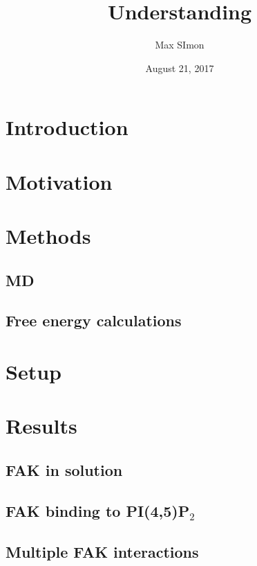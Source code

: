 \documentclass[
12pt, %
parskip=half, %
digital, %
oneside, %
]{bsc}
\title{Understanding}
\author{Max SImon}
\date{August 21, 2017}
\newcommand{\pip}{PI(4,5)P$_2$}
\begin{document}
	
\chapter{Introduction}

\chapter{Motivation}

\chapter{Methods}
\section{MD}
\section{Free energy calculations}
%
%
%
\chapter{Setup}

\chapter{Results}
\section{FAK in solution}
\label{sec:fak_sol}

\section{FAK binding to \pip{}}



\section{Multiple FAK interactions}

\end{document}
